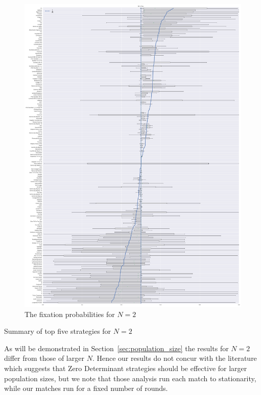 \documentclass{article}
\begin{document}
\begin{figure}[!hbtp]
    \centering
    \includegraphics[height=.8\textheight]{./img/boxplot_2_invade.pdf}
    \caption{The fixation probabilities for \(N=2\)}
    \label{fig:boxplot_2}
\end{figure}

\begin{table}[!hbtp]
    \centering
    
    \caption{Summary of top five strategies for \(N=2\)}
    \label{tbl:summary_top_2}
\end{table}

As will be demonstrated in Section~\ref{sec:population_size} the results for
\(N=2\) differ from those of larger $N$. Hence our results do not concur with
the literature which suggests that Zero Determinant strategies should be
effective for larger population sizes, but we note that those analysis run each
match to stationarity, while our matches run for a fixed number of rounds.
\end{document}
